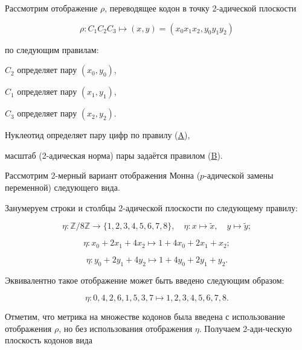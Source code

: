 Рассмотрим отображение $\rho$, переводящее кодон в точку 2-адической плоскости

$$

\rho: C_1C_2C_3\mapsto (x, y)=(x_0x_1x_2, y_0y_1y_2)

$$

по следующим правилам:

{$C_2$ определяет пару $(x_0, y_0)$,}

{$C_1$ определяет пару $(x_1, y_1)$,}

{$C_3$ определяет пару $(x_2, y_2)$.}



Нуклеотид определяет пару цифр по правилу (\hyperlink{pr:A}{A}),

масштаб (2-адическая норма) пары задаётся правилом (\hyperlink{pr:B}{B}).



Рассмотрим 2-мерный вариант отображения Монна ($p$-адической замены переменной) следующего вида.

Занумеруем строки и столбцы 2-адической плоскости по следующему правилу:

$$

\eta:\mathbb{Z}/8\mathbb{Z}\to\{1, 2, 3, 4, 5, 6, 7, 8\}, \quad \eta: x\mapsto\widetilde{x},\quad y\mapsto\widetilde{y};

$$

$$

\eta: x_0+2x_1+4x_2 \mapsto 1+ 4x_0+2x_1+x_2;

$$

$$

\eta: y_0+2y_1+4y_2 \mapsto 1+ 4y_0+2y_1+y_2.

$$

Эквивалентно такое отображение может быть введено следующим образом:

$$

\eta: 0, 4, 2, 6,     1, 5,   3, 7 \mapsto 1, 2, 3, 4, 5, 6, 7, 8.

$$





Отметим, что метрика на множестве кодонов была введена с использование отображения $\rho$, но без использования отображения $\eta$.  Получаем \mbox{2-ади}-ческую плоскость кодонов вида

